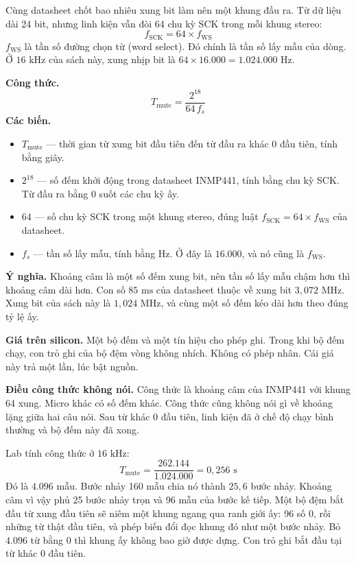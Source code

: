\documentclass[11pt,a4paper]{article}
\begin{document}
Cùng datasheet chốt bao nhiêu xung bit làm nên một khung đầu ra. Từ dữ liệu dài 24 bit, nhưng linh kiện vẫn đòi 64 chu kỳ SCK trong mỗi khung stereo:
\begin{equation*}
f_{\mathrm{SCK}} = 64 \times f_{\mathrm{WS}}
\end{equation*}
$f_{\mathrm{WS}}$ là tần số đường chọn từ (word select). Đó chính là tần số lấy mẫu của dòng. Ở $16\text{ kHz}$ của sách này, xung nhịp bit là $64 \times 16.000 = 1.024.000\text{ Hz}$.

\begin{equationcard}
\textbf{Công thức.}
\[
T_{\mathrm{mute}} = \frac{2^{18}}{64\, f_s}
\]
\textbf{Các biến.}
\begin{itemize}\setlength{\itemsep}{1pt}
    \item $T_{\mathrm{mute}}$ --- thời gian từ xung bit đầu tiên đến từ đầu ra khác 0 đầu tiên, tính bằng giây.
    \item $2^{18}$ --- số đếm khởi động trong datasheet INMP441, tính bằng chu kỳ SCK. Từ đầu ra bằng 0 suốt các chu kỳ ấy.
    \item $64$ --- số chu kỳ SCK trong một khung stereo, đúng luật $f_{\mathrm{SCK}} = 64 \times f_{\mathrm{WS}}$ của datasheet.
    \item $f_s$ --- tần số lấy mẫu, tính bằng Hz. Ở đây là $16.000$, và nó cũng là $f_{\mathrm{WS}}$.
\end{itemize}
\textbf{Ý nghĩa.} Khoảng câm là một số đếm xung bit, nên tần số lấy mẫu chậm hơn thì khoảng câm dài hơn. Con số $85\text{ ms}$ của datasheet thuộc về xung bit $3{,}072\text{ MHz}$. Xung bit của sách này là $1{,}024\text{ MHz}$, và cùng một số đếm kéo dài hơn theo đúng tỷ lệ ấy.

\textbf{Giá trên silicon.} Một bộ đếm và một tín hiệu cho phép ghi. Trong khi bộ đếm chạy, con trỏ ghi của bộ đệm vòng không nhích. Không có phép nhân. Cái giá này trả một lần, lúc bật nguồn.

\textbf{Điều công thức không nói.} Công thức là khoảng câm của INMP441 với khung 64 xung. Micro khác có số đếm khác. Công thức cũng không nói gì về khoảng lặng giữa hai câu nói. Sau từ khác 0 đầu tiên, linh kiện đã ở chế độ chạy bình thường và bộ đếm này đã xong.
\end{equationcard}

Lab tính công thức ở $16\text{ kHz}$:
\[
T_{\mathrm{mute}} = \frac{262.144}{1.024.000} = 0{,}256\text{ s}
\]
Đó là $4.096$ mẫu. Bước nhảy 160 mẫu chia nó thành $25{,}6$ bước nhảy. Khoảng câm vì vậy phủ 25 bước nhảy trọn và 96 mẫu của bước kế tiếp. Một bộ đệm bắt đầu từ xung đầu tiên sẽ niêm một khung ngang qua ranh giới ấy: 96 số 0, rồi những từ thật đầu tiên, và phép biến đổi đọc khung đó như một bước nhảy. Bỏ $4.096$ từ bằng 0 thì khung ấy không bao giờ được dựng. Con trỏ ghi bắt đầu tại từ khác 0 đầu tiên.
\end{document}
